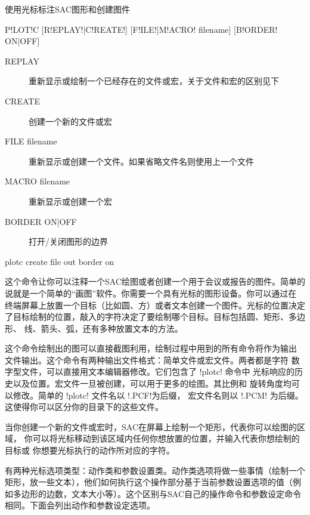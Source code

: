 \label{cmd:plotc}

使用光标标注SAC图形和创建图件

\begin{SACSTX}
P!LOT!C [R!EPLAY!|C!REATE!] [F!ILE!|M!ACRO! filename] [B!ORDER! ON|OFF]
\end{SACSTX}

\begin{description}
\item [REPLAY] 重新显示或绘制一个已经存在的文件或宏，关于文件和宏的区别见下
\item [CREATE] 创建一个新的文件或宏
\item [FILE filename] 重新显示或创建一个文件。如果省略文件名则使用上一个文件
\item [MACRO filename] 重新显示或创建一个宏
\item [BORDER ON|OFF] 打开/关闭图形的边界
\end{description}

\begin{SACDFT}
plotc create file out border on
\end{SACDFT}

这个命令让你可以注释一个SAC绘图或者创建一个用于会议或报告的图件。简单的
说就是一个简单的``画图''软件。你需要一个具有光标的图形设备。你可以通过在
终端屏幕上放置一个目标（比如圆、方）或者文本创建一个图件。光标的位置决定
了目标绘制的位置，敲入的字符决定了要绘制哪个目标。目标包括圆、矩形、多边形、
线、箭头、弧，还有多种放置文本的方法。

这个命令绘制出的图可以直接截图利用，绘制过程中用到的所有命令将作为输出
文件输出。这个命令有两种输出文件格式：简单文件或宏文件。两者都是字符
数字型文件，可以直接用文本编辑器修改。它们包含了 !plotc! 命令中
光标响应的历史以及位置。宏文件一旦被创建，可以用于更多的绘图。其比例和
旋转角度均可以修改。简单的 !plotc! 文件名以 !.PCF!为后缀，
宏文件名则以 !.PCM! 为后缀。这使得你可以区分你的目录下的这些文件。

当你创建一个新的文件或宏时，SAC在屏幕上绘制一个矩形，代表你可以绘图的区域，
你可以将光标移动到该区域内任何你想放置的位置，并输入代表你想绘制的目标或
你想要光标执行的动作所对应的字符。

有两种光标选项类型：动作类和参数设置类。动作类选项将做一些事情（绘制一个
矩形，放一些文本），他们如何执行这个操作部分基于当前参数设置选项的值（例
如多边形的边数，文本大小等）。这个区别与SAC自己的操作命令和参数设定命令
相同。下面会列出动作和参数设定选项。

